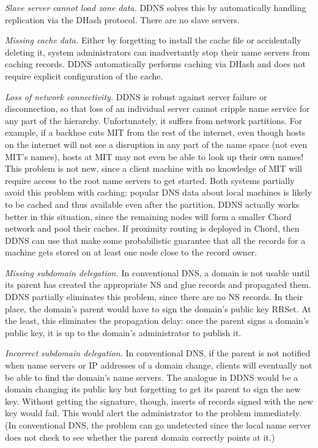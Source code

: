 {\em Slave server cannot load zone data.}
DDNS solves this by automatically handling replication 
via the DHash protocol.
There are no slave servers.

{\em Missing cache data.}
Either by forgetting to install the cache file or accidentally deleting it,
system administrators can inadvertantly stop their name servers
from caching records.
DDNS automatically performs caching via DHash and does
not require explicit configuration of the cache.

{\em Loss of network connectivity.}
DDNS is robust against server failure or disconnection, so that loss of
an individual server cannot cripple name service for any part of the
hierarchy. Unfortunately, it suffers from 
network partitions. For example, if a backhoe cuts MIT from 
the rest of the internet,
even though hosts on the internet will not see a disruption in any
part of the name space (not even MIT's names), hosts at MIT
may not even be able to look up their own names! 
This problem is not new, since a client machine with no 
knowledge of MIT will require access to the root name servers
to get started.
Both systems partially avoid this problem with caching:
popular DNS data about local machines is likely to be cached
and thus available even after the partition.
DDNS actually works better in this situation, since the remaining
nodes will form a smaller Chord network and pool their caches.
If proximity routing is deployed in Chord, then DDNS
can use that make some probabilistic guarantee that all the 
records for a machine gets stored on at least one node close to
the record owner.
%

{\em Missing subdomain delegation.}
In conventional DNS, a domain is not usable until its parent
has created the appropriate NS and glue records and
propagated them.
DDNS partially eliminates this problem, since there are 
no NS records.
In their place, the domain's parent would have to sign the domain's
public key RRSet.
At the least, this eliminates the propagation delay: once the
parent signs a domain's public key, it is up to the domain's administrator
to publish it.

{\em Incorrect subdomain delegation.}
In conventional DNS, if the parent is not notified 
when name servers or IP addresses of a domain change,
clients will eventually not be able to find the domain's name servers.
The analogue in DDNS would be a domain changing its public
key but forgetting to get its parent to sign the new key.
Without getting the signature, though, inserts of records signed
with the new key would fail.  This would alert the administrator
to the problem immediately.  (In conventional DNS, the problem
can go undetected since the local name server does not check
to see whether the parent domain correctly points at it.)

